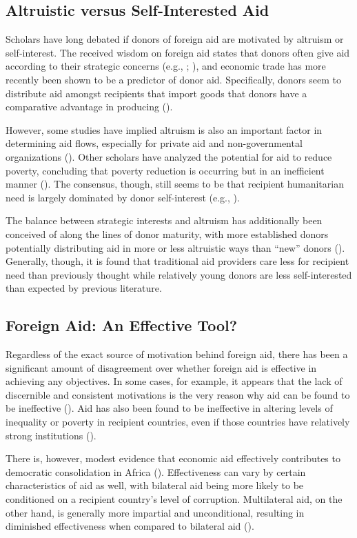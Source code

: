 \documentclass{article}
\begin{document}
\subsection*{Altruistic versus Self-Interested Aid}
Scholars have long debated if donors of foreign aid are motivated by altruism or self-interest. The received wisdom on foreign aid states that donors often give aid according to their strategic concerns (e.g., \cite{mckinlay1977}; \cite{alesina2000}), and economic trade has more recently been shown to be a predictor of donor aid. Specifically, donors seem to distribute aid amongst recipients that import goods that donors have a comparative advantage in producing (\cite{younas2008}).

However, some studies have implied altruism is also an important factor in determining aid flows, especially for private aid and non-governmental organizations (\cite{buthe2012}). Other scholars have analyzed the potential for aid to reduce poverty, concluding that poverty reduction is occurring but in an inefficient manner (\cite{collier2002}). The consensus, though, still seems to be that recipient humanitarian need is largely dominated by donor self-interest (e.g., \cite{hoeffler2011}).

The balance between strategic interests and altruism has additionally been conceived of along the lines of donor maturity, with more established donors potentially distributing aid in more or less altruistic ways than ``new'' donors (\cite{dreher2011}). Generally, though, it is found that traditional aid providers care less for recipient need than previously thought while relatively young donors are less self-interested than expected by previous literature.

\subsection*{Foreign Aid: An Effective Tool?}
Regardless of the exact source of motivation behind foreign aid, there has been a significant amount of disagreement over whether foreign aid is effective in achieving any objectives. In some cases, for example, it appears that the lack of discernible and consistent motivations is the very reason why aid can be found to be ineffective (\cite{collier2002}). Aid has also been found to be ineffective in altering levels of inequality or poverty in recipient countries, even if those countries have relatively strong institutions (\cite{chong2009a}).

There is, however, modest evidence that economic aid effectively contributes to democratic consolidation in Africa (\cite{dietrich2015a}). Effectiveness can vary by certain characteristics of aid as well, with bilateral aid being more likely to be conditioned on a recipient country's level of corruption. Multilateral aid, on the other hand, is generally more impartial and unconditional, resulting in diminished effectiveness when compared to bilateral aid (\cite{christensen2011}).
\end{document}
